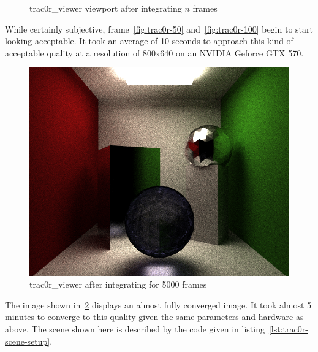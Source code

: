 \documentclass[
  twoside,
  11pt, a4paper,
  footinclude=true,
  headinclude=true,
  cleardoublepage=empty
]{scrreprt}
\begin{document}
\begin{figure}[H]
    \centering
    \caption{trac0r\_viewer viewport after integrating \(n\) frames}
    \label{fig:trac0r_n_frames}
\end{figure}

While certainly subjective, frame~\ref{fig:trac0r-50} and~\ref{fig:trac0r-100} begin to start looking
acceptable. It took an average of 10 seconds to approach this kind of acceptable quality at a
resolution of 800x640 on an NVIDIA Geforce GTX 570.

\begin{figure}[H]
    \includegraphics[scale=0.5]{trac0r-5000.png}
    \centering
    \caption{trac0r\_viewer after integrating for 5000 frames}
    \label{fig:trac0r-5000}
\end{figure}

The image shown in~\ref{fig:trac0r-5000} displays an almost fully converged image. It took almost 5
minutes to converge to this quality given the same parameters and hardware as above. The scene
shown here is described by the code given in listing~\ref{lst:trac0r-scene-setup}.
\end{document}
